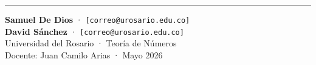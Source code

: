 \documentclass[a4paper,9pt]{article}
\begin{document}
{  \vfill
  {\color{Navy!30}\rule{\linewidth}{0.4pt}}
  \vspace{3pt}

  \begin{tcolorbox}[enhanced,sharp corners,colback=Navy!4,colframe=Navy!30,
      top=3pt,bottom=3pt,left=4pt,right=4pt,before skip=2pt,after skip=0pt]
    {\tiny\color{Navy!70}
    \textbf{Samuel De Dios} · \texttt{[correo@urosario.edu.co]}\\
    \textbf{David S\'anchez} · \texttt{[correo@urosario.edu.co]}\\[2pt]
    Universidad del Rosario · Teor\'ia de N\'umeros\\
    Docente: Juan Camilo Arias · Mayo 2026}
  \end{tcolorbox}
}%
\end{document}
